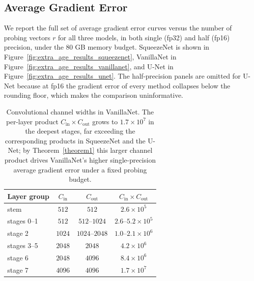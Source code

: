 \documentclass[10pt]{article}
\begin{document}
\subsection{Average Gradient Error}
\label{app:avg_grad_err}

We report the full set of average gradient error curves versus the number of probing vectors $r$ for all three models, in both single (fp32) and half (fp16) precision, under the $80$ GB memory budget. SqueezeNet is shown in Figure~\ref{fig:extra_age_results_squeezenet}, VanillaNet in Figure~\ref{fig:extra_age_results_vanillanet}, and U-Net in Figure~\ref{fig:extra_age_results_unet}. The half-precision panels are omitted for U-Net because at fp16 the gradient error of every method collapses below the rounding floor, which makes the comparison uninformative.

\begin{table}[h]
\centering
\small
\caption{Convolutional channel widths in VanillaNet. The per-layer product $C_{\text{in}}\times C_{\text{out}}$ grows to $1.7\times10^7$ in the deepest stages, far exceeding the corresponding products in SqueezeNet and the U-Net; by Theorem~\ref{theorem1} this larger channel product drives VanillaNet's higher single-precision average gradient error under a fixed probing budget.}
\label{tab:vanillanet_channels}
\begin{tabular}{lccc}
\toprule
Layer group & $C_{\text{in}}$ & $C_{\text{out}}$ & $C_{\text{in}}\times C_{\text{out}}$ \\
\midrule
stem & $512$ & $512$ & $2.6\times10^5$ \\
stages 0--1 & $512$ & $512$--$1024$ & $2.6$--$5.2\times10^5$ \\
stage 2 & $1024$ & $1024$--$2048$ & $1.0$--$2.1\times10^6$ \\
stages 3--5 & $2048$ & $2048$ & $4.2\times10^6$ \\
stage 6 & $2048$ & $4096$ & $8.4\times10^6$ \\
stage 7 & $4096$ & $4096$ & $1.7\times10^7$ \\
\bottomrule
\end{tabular}
\end{table}
\end{document}
